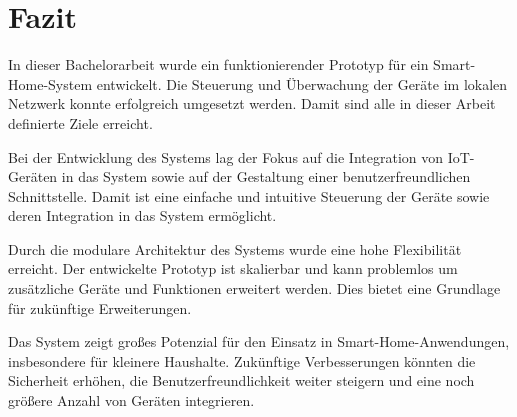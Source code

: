 \documentclass[12pt, letterpaper]{article}
\begin{document}
\section{Fazit}
\par In dieser Bachelorarbeit wurde ein funktionierender Prototyp für ein Smart-Home-System entwickelt. Die Steuerung und Überwachung der Geräte im lokalen Netzwerk konnte erfolgreich umgesetzt werden. Damit sind alle in dieser Arbeit definierte Ziele erreicht.
\par Bei der Entwicklung des Systems lag der Fokus auf die Integration von IoT-Geräten in das System sowie auf der Gestaltung einer benutzerfreundlichen Schnittstelle. Damit ist eine einfache und intuitive Steuerung der Geräte sowie deren Integration in das System ermöglicht. 
\par Durch die modulare Architektur des Systems wurde eine hohe Flexibilität erreicht. Der entwickelte Prototyp ist skalierbar und kann problemlos um zusätzliche Geräte und Funktionen erweitert werden. Dies bietet eine Grundlage für zukünftige Erweiterungen. 
\par Das System zeigt großes Potenzial für den Einsatz in Smart-Home-Anwendungen, insbesondere für kleinere Haushalte. Zukünftige Verbesserungen könnten die Sicherheit erhöhen, die Benutzerfreundlichkeit weiter steigern und eine noch größere Anzahl von Geräten integrieren.
\newpage
\end{document}
